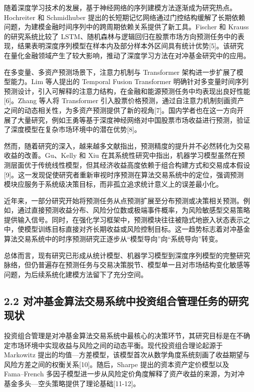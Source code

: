 \documentclass[UTF8]{ctexart}
\begin{document}
随着深度学习技术的发展，基于神经网络的序列建模方法逐渐成为研究热点。Hochreiter
和 Schmidhuber
提出的长短期记忆网络通过门控结构缓解了长期依赖问题，为建模金融时间序列中的跨周期依赖关系提供了新工具。Fischer
和 Krauss 的研究系统比较了
LSTM、随机森林与逻辑回归在股票市场方向预测任务中的表现，结果表明深度序列模型在样本内及部分样本外区间具有统计优势{[}5{]}。该研究在量化金融领域产生了较大影响，推动了深度学习方法在对冲基金研究中的应用。

在多变量、多资产预测场景下，注意力机制与 Transformer
架构进一步扩展了模型能力。Lim 等人提出的 Temporal Fusion Transformer
明确针对多变量时间序列预测设计，引入可解释的注意力结构，在金融和能源预测任务中均表现出良好性能{[}6{]}。Zhang
等人将 Transformer
引入股票价格预测，通过自注意力机制刻画资产之间的动态相关性，为多资产预测提供了新的视角{[}7{]}。国内学者也在这一方向开展了大量研究，例如王勇等基于深度神经网络对中国股票市场收益进行预测，验证了深度模型在复杂市场环境中的潜在优势{[}8{]}。

然而，随着研究的深入，越来越多文献指出，预测精度的提升并不必然转化为交易收益的改善。Gu、Kelly
和 Xiu
在其系统性研究中指出，机器学习模型虽然在预测层面优于传统线性模型，但其经济收益高度依赖于组合构建方式和交易成本假设{[}9{]}。这一发现促使研究者重新审视时序预测在算法交易系统中的定位，强调预测模块应服务于系统级决策目标，而非孤立追求统计意义上的误差最小化。

近年来，一部分研究开始将预测任务从点预测扩展至分布预测或决策相关预测。例如，通过直接预测收益分布、风险分位数或极端事件概率，为风险敏感型交易策略提供输入信号。同时，在强化学习框架中，预测模块往往被隐式地嵌入状态表示之中，使模型训练目标直接对齐长期收益或风险控制目标。这一趋势标志着对冲基金算法交易系统中的时序预测研究正逐步从``模型导向''向``系统导向''转变。

总体而言，现有研究已形成从统计模型、机器学习模型到深度序列模型的完整研究脉络，但仍普遍存在预测任务与交易决策脱节、模型单一且对市场结构变化敏感等问题，为后续系统化建模方法留下了充分空间。

\subsection{2.2
对冲基金算法交易系统中投资组合管理任务的研究现状}\label{ux5bf9ux51b2ux57faux91d1ux7b97ux6cd5ux4ea4ux6613ux7cfbux7edfux4e2dux6295ux8d44ux7ec4ux5408ux7ba1ux7406ux4efbux52a1ux7684ux7814ux7a76ux73b0ux72b6}

投资组合管理是对冲基金算法交易系统中最核心的决策环节，其研究目标是在不确定市场环境中实现收益与风险之间的动态平衡。现代投资组合理论起源于
Markowitz
提出的均值---方差模型，该模型首次从数学角度系统刻画了收益期望与风险方差之间的权衡关系{[}10{]}。随后，Sharpe
提出的资本资产定价模型以及 Fama--French
多因子模型进一步从风险定价角度解释了资产收益的来源，为对冲基金多头---空头策略提供了理论基础{[}11-12{]}。
\end{document}
